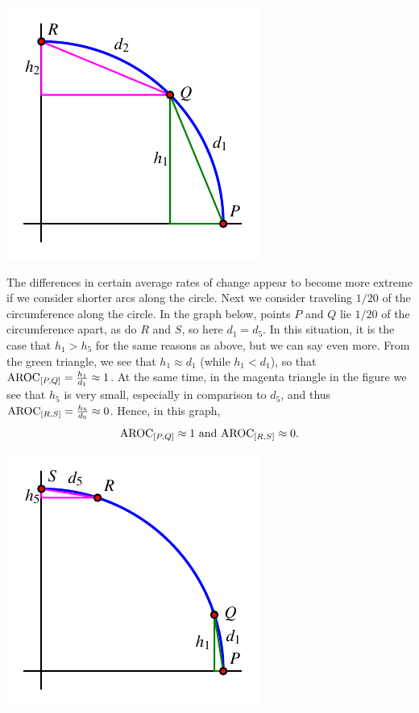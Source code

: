 \documentclass[nooutcomes, noauthor]{ximera}
\begin{document}
\begin{image}
\includegraphics{traversing-circular-aroc-circle-eighth.pdf}
\end{image}

The differences in certain average rates of change appear to become more extreme if we consider shorter arcs along the circle.  Next we consider traveling \(1/20\) of the circumference along the circle.  In the graph below, points \(P\) and \(Q\) lie \(1/20\) of the circumference apart, as do \(R\) and \(S\), so here \(d_1 = d_5\).  In this situation, it is the case that \(h_1 \gt h_5\) for the same reasons as above, but we can say even more.  From the green triangle, we see that \(h_1 \approx d_1\) (while \(h_1 \lt d_1\)), so that \(\mathrm{AROC}_{[P,Q]} = \frac{h_1}{d_1} \approx 1\).  At the same time, in the magenta triangle in the figure we see that \(h_5\) is very small, especially in comparison to \(d_5\), and thus \(\mathrm{AROC}_{[R,S]} = \frac{h_5}{d_5} \approx 0\).  Hence, in this graph,%
\begin{equation*}
\mathrm{AROC}_{[P,Q]} \approx 1 \text{ and } \mathrm{AROC}_{[R,S]} \approx 0\text{.}
\end{equation*}

\begin{image}
\includegraphics{traversing-circular-aroc-circle-20th.pdf}
\end{image}
\end{document}
